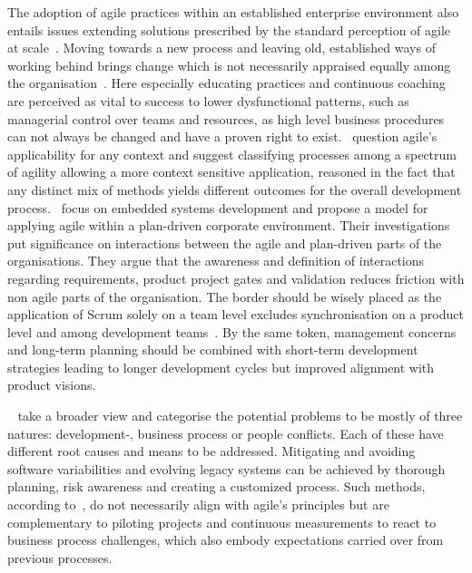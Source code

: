 The adoption of agile practices within an established enterprise environment also entails issues extending solutions prescribed by the standard perception of agile at scale~\citep{larman2008scalingleanagile}. Moving towards a new process and leaving old, established ways of working behind brings change which is not necessarily appraised equally among the organisation~\citep{benefield2008agileenterprise}. Here especially educating practices and continuous coaching are perceived as vital to success to lower dysfunctional patterns, such as managerial control over teams and resources, as high level business procedures can not always be changed and have a proven right to exist.~\citet{turk2000limitationsagile} question agile's applicability for any context and suggest classifying processes among a spectrum of agility allowing a more context sensitive application, reasoned in the fact that any distinct mix of methods yields different outcomes for the overall development process.~\citet{eklund2012agileembedded} focus on  embedded systems development and propose a model for applying agile within a plan-driven corporate environment. Their investigations put significance on interactions between the agile and plan-driven parts of the organisations. They argue that the awareness and definition of interactions regarding requirements, product project gates and validation reduces friction with non agile parts of the organisation. The border should be wisely placed as the application of Scrum solely on a team level excludes synchronisation on a product level and among development teams~\citep{laanti2008implprogrammodel}. By the same token, management concerns and long-term planning should be combined with short-term development strategies leading to longer development cycles but improved alignment with product visions.

~\citet{boehm2005challengesagile} take a broader view and categorise the potential problems to be mostly of three natures: development-, business process or people conflicts. Each of these have different root causes and means to be addressed. Mitigating and avoiding software variabilities and evolving legacy systems can be achieved by thorough planning, risk awareness and creating a customized process. Such methods, according to~\citet{boehm2005challengesagile}, do not necessarily align with agile's principles but are complementary to piloting projects and continuous measurements to react to business process challenges, which also embody expectations carried over from previous processes.

